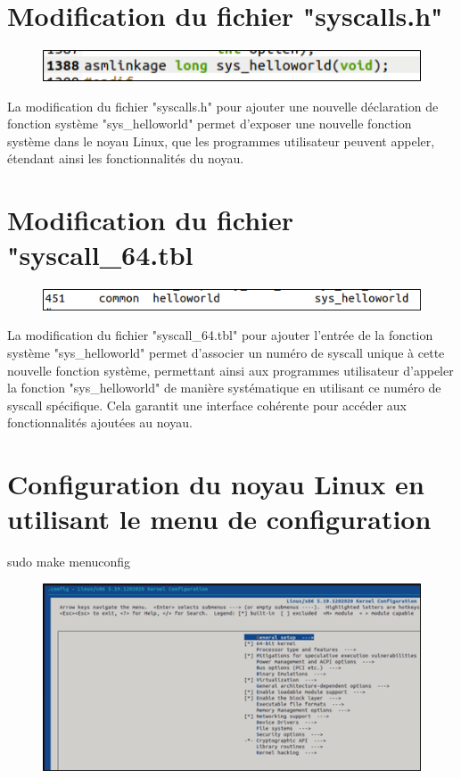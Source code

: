 \section{Modification du fichier "syscalls.h" }
\begin{figure}[h]
    \includegraphics[width=1\textwidth]{images/32.png}   
\end{figure}
La modification du fichier "syscalls.h" pour ajouter une nouvelle déclaration de fonction système "sys\_helloworld" permet d'exposer une nouvelle fonction système dans le noyau Linux, que les programmes utilisateur peuvent appeler, étendant ainsi les fonctionnalités du noyau.
\section{Modification du fichier "syscall\_64.tbl}
\begin{figure}[h]
    \includegraphics[width=1\textwidth]{images/33.png}   
\end{figure}
La modification du fichier "syscall\_64.tbl" pour ajouter l'entrée de la fonction système "sys\_helloworld" permet d'associer un numéro de syscall unique à cette nouvelle fonction système, permettant ainsi aux programmes utilisateur d'appeler la fonction "sys\_helloworld" de manière systématique en utilisant ce numéro de syscall spécifique. Cela garantit une interface cohérente pour accéder aux fonctionnalités ajoutées au noyau.
\newpage
\section{Configuration du noyau Linux en utilisant le menu de configuration}
sudo make menuconfig
\begin{figure}[h]
    \includegraphics[width=1\textwidth]{images/34.png}   
\end{figure}
